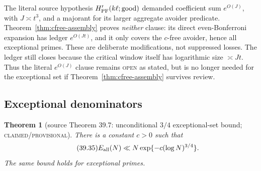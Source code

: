 \documentclass[10pt,reqno]{amsart}
\newtheorem{theorem}{Theorem}[section]
\theoremstyle{definition}
\newcommand{\1}{\mathbf 1}
\begin{document}
The literal source hypothesis $H_{\rm PF}'(k\ell;{\rm good})$ demanded
coefficient sum $e^{O(J)}$, with $J\asymp t^3$, and a majorant for its larger
aggregate avoider predicate.  Theorem~\ref{thm:cfree-assembly} proves
\emph{neither} clause: its direct even-Bonferroni expansion has ledger
$e^{O(Jt)}$, and it only covers the $c$-free avoider, hence all exceptional
primes.  These are deliberate modifications, not suppressed losses.  The
ledger still closes because the critical window itself has logarithmic size
$\asymp Jt$.  Thus the literal $e^{O(J)}$ clause remains \textsc{open} as
stated, but is no longer needed for the exceptional set if
Theorem~\ref{thm:cfree-assembly} survives review.

\subsection{Exceptional denominators}
\begin{theorem}[source Theorem 39.7: unconditional $3/4$ exceptional-set
bound; \textsc{claimed/provisional}]\label{thm:three-quarter}
There is a constant $c>0$ such that
\begin{equation}\tag{39.35}
 E_{\rm all}(N)\ll N\exp\{-c(\log N)^{3/4}\}.
\end{equation}
The same bound holds for exceptional primes.
\end{theorem}
\end{document}
